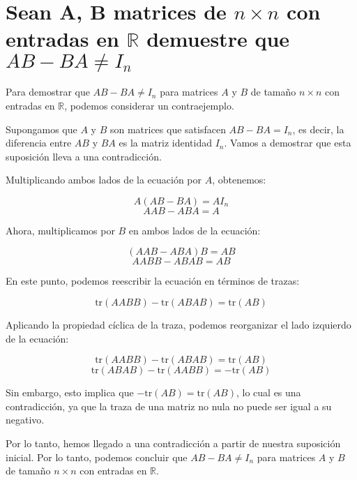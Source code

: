 \section{Sean A, B matrices de $n \times n$ con entradas en $\mathbb{R}$ demuestre que $AB-BA \neq I_n$}

Para demostrar que $AB - BA \neq I_n$ para matrices $A$ y $B$ de tamaño $n \times n$ con entradas en $\mathbb{R}$, podemos considerar un contraejemplo. 

Supongamos que $A$ y $B$ son matrices que satisfacen $AB - BA = I_n$, es decir, la diferencia entre $AB$ y $BA$ es la matriz identidad $I_n$. Vamos a demostrar que esta suposición lleva a una contradicción.

Multiplicando ambos lados de la ecuación por $A$, obtenemos:

$$A(AB - BA) = AI_n$$
$$AAB - ABA = A$$

Ahora, multiplicamos por $B$ en ambos lados de la ecuación:

$$(AAB - ABA)B = AB$$
$$AABB - ABAB = AB$$

En este punto, podemos reescribir la ecuación en términos de trazas:

$$\text{tr}(AABB) - \text{tr}(ABAB) = \text{tr}(AB)$$

Aplicando la propiedad cíclica de la traza, podemos reorganizar el lado izquierdo de la ecuación:

$$\text{tr}(AABB) - \text{tr}(ABAB) = \text{tr}(AB)$$
$$\text{tr}(ABAB) - \text{tr}(AABB) = -\text{tr}(AB)$$

Sin embargo, esto implica que $-\text{tr}(AB) = \text{tr}(AB)$, lo cual es una contradicción, ya que la traza de una matriz no nula no puede ser igual a su negativo.

Por lo tanto, hemos llegado a una contradicción a partir de nuestra suposición inicial. Por lo tanto, podemos concluir que $AB - BA \neq I_n$ para matrices $A$ y $B$ de tamaño $n \times n$ con entradas en $\mathbb{R}$.
